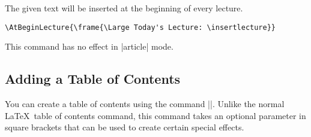 
\begin{command}{\AtBeginLecture{}}
  The given text will be inserted at the beginning of every
  lecture.

  \example
\begin{verbatim}
\AtBeginLecture{\frame{\Large Today's Lecture: \insertlecture}}
\end{verbatim}

  \articlenote
  This command has no effect in |article| mode.
\end{command}


\subsection{Adding a Table of Contents}

You can create a table of contents using the command |\tableofcontents|. Unlike the normal \LaTeX\ table of contents command, this command takes an optional parameter in square brackets that can be used to create certain special effects.

